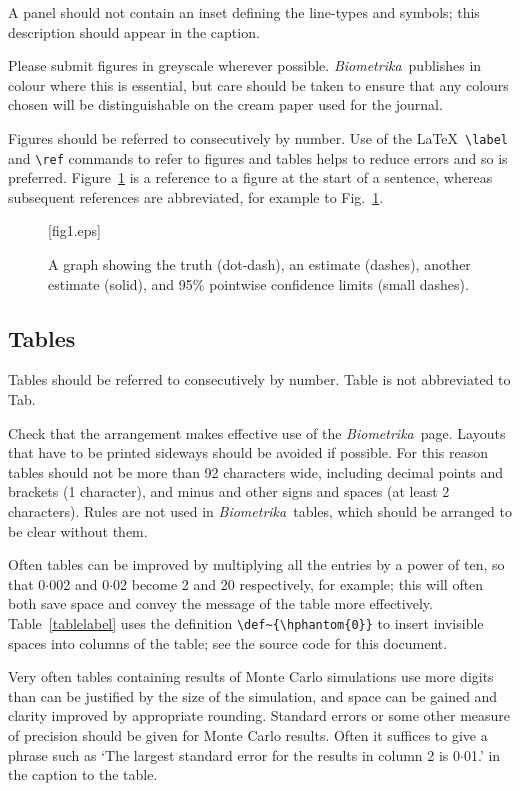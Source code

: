 \documentclass[lineno]{biometrika}
\def\Bka{{\it Biometrika}}
\begin{document}
A panel should not contain an inset defining the line-types and symbols; this description should appear in the caption.

Please submit figures in greyscale wherever possible.  \Bka\ publishes in colour where this is essential, but care should be taken to ensure that any colours chosen will be distinguishable on the cream paper used for the journal.

Figures should be referred to consecutively by number. Use of the \LaTeX\ \verb+\label+ and \verb+\ref+ commands to refer to figures and tables helps to reduce errors and so is preferred.  Figure~\ref{fig1}  is a reference to a figure at the start of a sentence, whereas subsequent references are abbreviated, for example to Fig.~\ref{fig1}.

\begin{figure}
\figurebox{20pc}{25pc}{}[fig1.eps]
\caption{A graph showing the truth (dot-dash), an estimate (dashes), another estimate (solid), and 95\% pointwise confidence limits (small dashes).}
\label{fig1}
\end{figure}

\subsection{Tables}

Tables should be referred to consecutively by number. Table is not abbreviated to Tab.

Check that the arrangement makes effective use
of the \Bka\ page. Layouts that have to be printed sideways should be avoided
if possible. For this reason tables should not be more than 92 characters wide, including
decimal points and brackets (1 character), and minus and other signs and spaces (at least 2
characters).  Rules are not used in \Bka\ tables, which should be arranged to be clear without them.

Often tables can be improved by multiplying all the entries by a power of ten, so that 0$\cdot$002 and
0$\cdot$02 become 2 and 20 respectively, for example; this will often both save space and convey the message of the table more effectively. Table~\ref{tablelabel} uses the definition \verb+\def~{\hphantom{0}}+ to insert invisible spaces into columns of the table; see the source code for this document.

Very often tables containing results of Monte Carlo simulations use more digits than can be justified by the size of the simulation, and space can be gained and clarity improved by appropriate rounding.
Standard errors or some other measure of precision should be given for Monte Carlo results.
Often it suffices to give a phrase such as `The largest standard error for the results in column 2 is 0$\cdot$01.' in the caption to the table.
\end{document}
